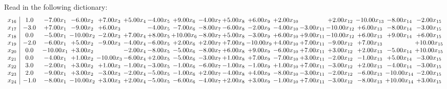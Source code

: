 \documentclass[9pt]{article}
\begin{document}
Read in the following dictionary:
\[\begin{array}{c| c c@{\hskip 2pt} c@{\hskip 2pt} c@{\hskip 2pt} c@{\hskip 2pt} c@{\hskip 2pt} c@{\hskip 2pt} c@{\hskip 2pt} c@{\hskip 2pt} c@{\hskip 2pt} c@{\hskip 2pt} c@{\hskip 2pt} c@{\hskip 2pt} c@{\hskip 2pt} c@{\hskip 2pt} c@{\hskip 2pt} }
 x_{16}   &  1.0 & -7.00 x_{1} & -6.00 x_{2} & +  7.00 x_{3} & +  5.00 x_{4} & -4.00 x_{5} & +  9.00 x_{6} & -4.00 x_{7} & +  5.00 x_{8} & +  6.00 x_{9} & +  2.00 x_{10} &   & +  2.00 x_{12} & -10.00 x_{13} & -8.00 x_{14} & -2.00 x_{15}\\
 x_{17}   &  -3.0 & +  7.00 x_{1} & -9.00 x_{2} & +  6.00 x_{3} &   & -4.00 x_{5} & -7.00 x_{6} & -8.00 x_{7} & -6.00 x_{8} & -2.00 x_{9} & -4.00 x_{10} & -3.00 x_{11} & -10.00 x_{12} & +  6.00 x_{13} & -8.00 x_{14} & -3.00 x_{15}\\
 x_{18}   &  0.0 & -5.00 x_{1} & -10.00 x_{2} & -2.00 x_{3} & +  7.00 x_{4} & +  8.00 x_{5} & + 10.00 x_{6} & -8.00 x_{7} & +  5.00 x_{8} & -3.00 x_{9} & +  6.00 x_{10} & +  9.00 x_{11} & -10.00 x_{12} & +  6.00 x_{13} & +  9.00 x_{14} & +  6.00 x_{15}\\
 x_{19}   &  -2.0 & -6.00 x_{1} & +  5.00 x_{2} & -9.00 x_{3} & -4.00 x_{4} & -6.00 x_{5} & +  2.00 x_{6} & +  2.00 x_{7} & +  7.00 x_{8} & -10.00 x_{9} & +  4.00 x_{10} & +  7.00 x_{11} & -9.00 x_{12} & +  7.00 x_{13} &   & + 10.00 x_{15}\\
 x_{20}   &  0.0 & -10.00 x_{1} & +  3.00 x_{2} &   & -2.00 x_{4} & -8.00 x_{5} & -5.00 x_{6} & -8.00 x_{7} & +  6.00 x_{8} & +  9.00 x_{9} & -6.00 x_{10} & +  7.00 x_{11} & +  3.00 x_{12} & +  2.00 x_{13} & -5.00 x_{14} & + 10.00 x_{15}\\
 x_{21}   &  0.0 & -4.00 x_{1} & +  1.00 x_{2} & -10.00 x_{3} & -6.00 x_{4} & +  2.00 x_{5} & -5.00 x_{6} & -3.00 x_{7} & +  1.00 x_{8} & +  7.00 x_{9} & -7.00 x_{10} & +  3.00 x_{11} & -2.00 x_{12} & -1.00 x_{13} & +  5.00 x_{14} & -3.00 x_{15}\\
 x_{22}   &  3.0 & -2.00 x_{1} & +  3.00 x_{2} & +  1.00 x_{3} & -1.00 x_{4} & -3.00 x_{5} & -1.00 x_{6} & -6.00 x_{7} & -1.00 x_{8} & -1.00 x_{9} & +  1.00 x_{10} & +  7.00 x_{11} & -3.00 x_{12} & +  2.00 x_{13} & -4.00 x_{14} & -3.00 x_{15}\\
 x_{23}   &  2.0 & -9.00 x_{1} & +  3.00 x_{2} & -3.00 x_{3} & -2.00 x_{4} & -5.00 x_{5} & -1.00 x_{6} & +  2.00 x_{7} & -4.00 x_{8} & +  4.00 x_{9} & -8.00 x_{10} & -3.00 x_{11} & -2.00 x_{12} & -6.00 x_{13} & -10.00 x_{14} & -2.00 x_{15}\\
 x_{24}   &  -1.0 & -8.00 x_{1} & -10.00 x_{2} & +  3.00 x_{3} & +  2.00 x_{4} & -5.00 x_{5} & -6.00 x_{6} & -4.00 x_{7} & +  2.00 x_{8} & +  3.00 x_{9} & -1.00 x_{10} & +  7.00 x_{11} & -3.00 x_{12} & -8.00 x_{13} & + 10.00 x_{14} & +  3.00 x_{15}\\

\end{array}\]
\end{document}
